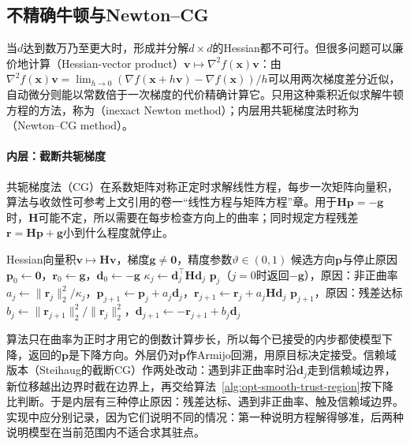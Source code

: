 \subsection{不精确牛顿与Newton--CG}
\label{sec:opt-smooth-newton-cg}

当$d$达到数万乃至更大时，形成并分解$d\times d$的Hessian都不可行。但很多问题可以廉价地计算（Hessian-vector product）$\bm v\mapsto\nabla^2f(\bm x)\bm v$：由$\nabla^2f(\bm x)\bm v=\lim_{h\to0}(\nabla f(\bm x+h\bm v)-\nabla f(\bm x))/h$可以用两次梯度差分近似，自动微分则能以常数倍于一次梯度的代价精确计算它。只用这种乘积近似求解牛顿方程的方法，称为（inexact Newton method）；内层用共轭梯度法时称为（Newton--CG method）。

\paragraph{内层：截断共轭梯度}
共轭梯度法（CG）在系数矩阵对称正定时求解线性方程，每步一次矩阵向量积，算法与收敛性可参考上文引用的卷一“线性方程与矩阵方程”章。用于$\bm H\bm p=-\bm g$时，$\bm H$可能不定，所以需要在每步检查方向上的曲率；同时规定方程残差$\bm r=\bm H\bm p+\bm g$小到什么程度就停止。

\begin{algorithm}
\label{alg:opt-smooth-newton-cg}
\begin{algorithmic}[1]
\Require Hessian向量积$\bm v\mapsto\bm H\bm v$，梯度$\bm g\neq\bm0$，精度参数$\vartheta\in(0,1)$
\Ensure 候选方向$\bm p$与停止原因
\State $\bm p_0\gets\bm0$，$\bm r_0\gets\bm g$，$\bm d_0\gets-\bm g$
  \State $\kappa_j\gets\bm d_j^\top\bm H\bm d_j$
   \State \Return $\bm p_j$（$j=0$时返回$-\bm g$），原因：非正曲率 \EndIf
  \State $a_j\gets\lVert\bm r_j\rVert_2^2/\kappa_j$，$\bm p_{j+1}\gets\bm p_j+a_j\bm d_j$，$\bm r_{j+1}\gets\bm r_j+a_j\bm H\bm d_j$
   \State \Return $\bm p_{j+1}$，原因：残差达标 \EndIf
  \State $b_j\gets\lVert\bm r_{j+1}\rVert_2^2/\lVert\bm r_j\rVert_2^2$，$\bm d_{j+1}\gets-\bm r_{j+1}+b_j\bm d_j$
\EndFor
\end{algorithmic}
\end{algorithm}

算法只在曲率为正时才用它的倒数计算步长，所以每个已接受的内步都使模型下降，返回的$\bm p$是下降方向。外层仍对$\bm p$作Armijo回溯，用原目标决定接受。信赖域版本（Steihaug的截断CG）作两处改动：遇到非正曲率时沿$\bm d_j$走到信赖域边界，新位移越出边界时截在边界上，再交给算法~\ref{alg:opt-smooth-trust-region}按下降比判断。于是内层有三种停止原因：残差达标、遇到非正曲率、触及信赖域边界。实现中应分别记录，因为它们说明不同的情况：第一种说明方程解得够准，后两种说明模型在当前范围内不适合求其驻点。

